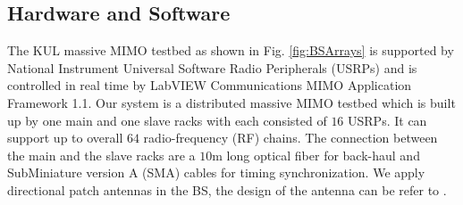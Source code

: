 \subsection{Hardware and Software}
The KUL massive MIMO testbed as shown in Fig. \ref{fig:BSArrays}  is supported by National Instrument Universal Software Radio Peripherals (USRPs) and is  controlled in real time by LabVIEW Communications MIMO Application Framework 1.1\cite{NIUSRP}. Our system is a distributed massive MIMO testbed which is built up by one main and one slave racks with each consisted of $16$ USRPs. It can support up to overall $64$ radio-frequency (RF) chains. The connection between the main and the slave racks are a $10$m long optical fiber for back-haul and SubMiniature version A (SMA) cables for timing synchronization. We apply directional patch antennas in the BS, the design of the antenna can be refer to \cite{chen2017finite}. 

